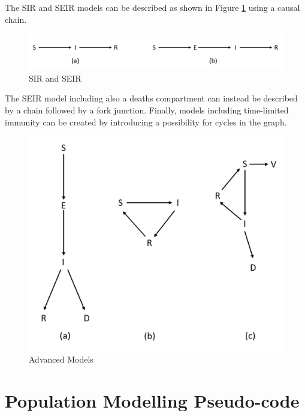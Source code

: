 \begin{appendices}
The SIR and SEIR models can be described as shown in Figure \ref{cd11} using a causal chain.

\begin{figure}[ht!]%
    \centering
    \includegraphics[width=0.9\linewidth]{latex/images/caus_eq.pdf}
    \caption{SIR and SEIR}
    \label{cd11}
\end{figure}

The SEIR model including also a deaths compartment can instead be described by a chain followed by a fork junction. Finally, models including time-limited immunity can be created by introducing a possibility for cycles in the graph.

\begin{figure}[ht!]%
    \centering
    \includegraphics[width=0.6\linewidth]{latex/images/caus_eq2.pdf}
    \caption{Advanced Models}
    \label{cd12}
\end{figure}

\clearpage

\section{Population Modelling Pseudo-code}
\label{code_alg}


\end{appendices}
